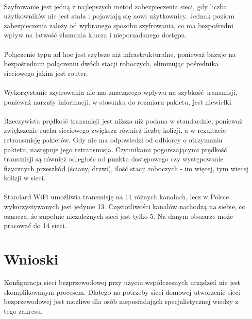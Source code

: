 \documentclass[wide,a4paper,titlepage,12pt] {article}
\begin{document}
 \paragraph{} %
 \label{par:}
 Szyfrowanie jest jedną z najlepszych metod zabezpieczenia sieci, gdy liczba użytkowników nie jest stała i pojawiają się nowi użytkownicy. Jednak poziom zabezpieczenia zależy od wybranego sposobu szyfrowania, co ma bezpośredni wpływ na łatwość złamania klucza i nieporzadanego dostępu.

\paragraph{} %
\label{par:}
Połączenie typu ad hoc jest szybsze niż infrastrukturalne, ponieważ bazuje na bezpośrednim połączeniu dwóch stacji roboczych, eliminując pośrednika sieciowego jakim jest router.

\paragraph{} %
\label{par:}
Wykorzystanie szyfrowania nie ma znaczącego wpływu na szybkość transmisji, ponieważ narzuty informacji, w stosunku do rozmiaru pakietu, jest niewielki.
\paragraph{} %
\label{par:}
Rzeczywista prędkość transmisji jest niższa niż podana w standardzie, ponieważ zwiększenie ruchu sieciowego zwiększa również liczbę kolizji, a w rezultacie retransmisję pakietów. Gdy nie ma odpowiedzi od odbiorcy o otrzymaniu pakietu, następuje jego retransmisja. Czynnikami pogorszającymi prędkość transmisji są również odległośc od punktu dostępowego czy występowanie fizycznych przeszkód (ściany, drzwi), ilość stacji roboczych - im więcej, tym wiecej kolizji w sieci.

\paragraph{} %
\label{par:}
Standard WiFi umożliwia transmisję na 14 różnych kanałach, lecz w Polsce wykorzystywanych jest jedynie 13. Częstotliwości kanałów nachodzą na siebie, co oznacza, że zupełnie niezależnych sieci jest tylko 5. Na danym obszarze może pracować do 14 sieci.

\section{Wnioski} %
\label{sec:wnioski}
Konfiguracja sieci bezprzewodowej przy użyciu współczesnych urządzeń nie jest skomplikowanym procesem. Dlatego na potrzeby sieci domowej utworzenie sieci bezprzewodowej jest możliwe dla osób nieposiadająch specjalistycznej wiedzy z tego zakresu.
\end{document}
